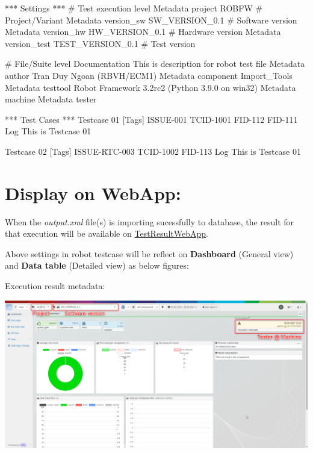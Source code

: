 \begin{robotcode}
*** Settings ***
# Test execution level
Metadata   project        ROBFW              # Project/Variant
Metadata   version_sw     SW_VERSION_0.1     # Software version
Metadata   version_hw     HW_VERSION_0.1     # Hardware version
Metadata   version_test   TEST_VERSION_0.1   # Test version

# File/Suite level
Documentation             This is description for robot test file
Metadata    author        Tran Duy Ngoan (RBVH/ECM1)
Metadata    component     Import_Tools
Metadata    testtool      Robot Framework 3.2rc2 (Python 3.9.0 on win32)
Metadata    machine       %
Metadata    tester        %

*** Test Cases ***
Testcase 01
   [Tags]   ISSUE-001   TCID-1001   FID-112   FID-111
   Log       This is Testcase 01

Testcase 02
   [Tags]   ISSUE-RTC-003   TCID-1002   FID-113
   Log       This is Testcase 01
\end{robotcode}

\hypertarget{description-display-on-webapp}{%
\section{Display on WebApp:}\label{description-display-on-webapp}}

When the \emph{output.xml} file(s) is importing sucessfully to database,
the result for that execution will be available on
\href{https://github.com/test-fullautomation/testresultwebapp}{TestResultWebApp}.

Above settings in robot testcase will be reflect on \textbf{Dashboard}
(General view) and \textbf{Data table} (Detailed view) as below figures:

Execution result metadata:

\includegraphics[width=1\linewidth]{./pictures/Dashboard.png}

